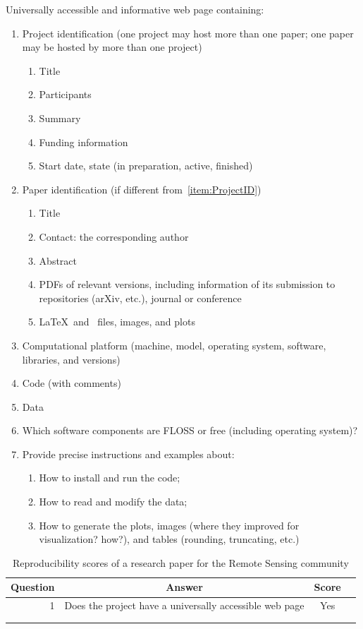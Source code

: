 \documentclass[journal,twopage]{IEEEtran}
\begin{document}
Universally accessible and informative web page containing:
	\begin{enumerate}
		\item\label{item:ProjectID} Project identification (one project may host more than one paper; one paper may be hosted by more than one project)
		\begin{enumerate}
			\item Title
			\item Participants
			\item Summary
			\item Funding information
			\item Start date, state (in preparation, active, finished)
		\end{enumerate}
		\item Paper identification (if different from~\ref{item:ProjectID})
		\begin{enumerate}
			\item Title
			\item Contact: the corresponding author
			\item Abstract
			\item PDFs of relevant versions, including information of its submission to repositories (arXiv, etc.), journal or conference
			\item\label{item:SourceDocumentFiles} \LaTeX\ and \BibTeX\ files, images, and plots
		\end{enumerate}
		\item\label{item:Platform} Computational platform (machine, model, operating system, software, libraries, and versions)
		\item Code (with comments)
		\item Data
		\item Which software components are FLOSS or free (including operating system)?
		\item Provide precise instructions and examples about:
		\begin{enumerate}
			\item How to install and run the code;
			\item How to read and modify the data;
			\item How to generate the plots, images (where they improved for visualization? how?), and tables (rounding, truncating, etc.)
		\end{enumerate}
	\end{enumerate}
	
	
	\begin{table}[hbt]
		\centering
		\caption{Reproducibility scores of a research paper for the Remote Sensing community}
		\label{tab:my_label}
		\begin{tabular}{rccc}\toprule
			Question    & Answer & Score \\ \midrule
			1           & Does the project have a universally accessible web page & Yes & \\ 
			&  \\
			& \\ \bottomrule
		\end{tabular}
	\end{table}
\end{document}
